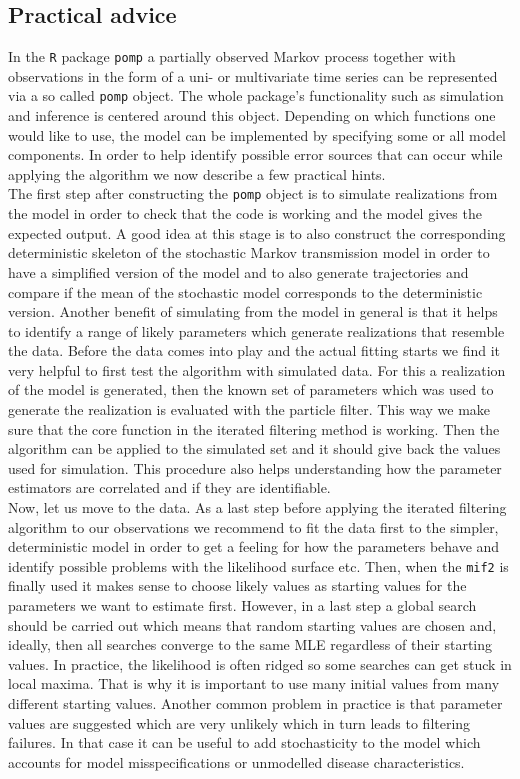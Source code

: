 \subsection{Practical advice} 
\label{tips}
In the \texttt{R} package \texttt{pomp} a partially observed Markov process together with observations in the form of a uni- or multivariate time series can be represented via a so called \texttt{pomp} object. The whole package's functionality such as simulation and inference is centered around this object. Depending on which functions one would like to use, the model can be implemented by specifying some or all model components. In order to help identify possible error sources that can occur while applying the algorithm we now describe a few practical hints.\\
The first step after constructing the \texttt{pomp} object is to simulate realizations from the model in order to check that the code is working and the model gives the expected output.  A good idea at this stage is  to also construct the corresponding deterministic skeleton of the stochastic Markov transmission model in order to have a simplified version of the model and to also generate trajectories and compare if the mean of the stochastic model corresponds to the deterministic version. Another benefit of simulating from the model in general is that it  helps  to identify a range of likely parameters which generate realizations that resemble the data.
Before the data comes into play and the actual fitting starts we find it very helpful to first test the algorithm with simulated data. For this a realization of the model is generated, then the known set of parameters which was used to generate the realization is evaluated with the particle filter. This way we make sure that the core function in the iterated filtering method is working. 
Then the algorithm can be applied to the simulated set and it should give back the values used for simulation. This procedure also  helps understanding  how the parameter estimators  are correlated and if they are identifiable.\\
 Now, let us move to the data.
As a last step before applying the  iterated filtering algorithm to our observations  we recommend to fit the data first to the simpler, deterministic  model in order to get a feeling for how the parameters behave and identify possible problems with the likelihood surface etc. 
Then, when the \texttt{mif2} is finally used it makes sense to choose likely values as starting values for the parameters we want to estimate first. However,  in a last step a global search should be carried out which means that random starting values are chosen  and, ideally, then all searches converge to the same MLE regardless of their starting values. In practice, the likelihood is often ridged so some searches can get stuck in local maxima. That is why it is important to use many initial values from many different starting values. Another common problem in practice is that parameter values are suggested which are very unlikely which in turn leads to filtering failures. In that case it can be useful to add stochasticity to the model which accounts for model misspecifications or unmodelled disease characteristics. \\
